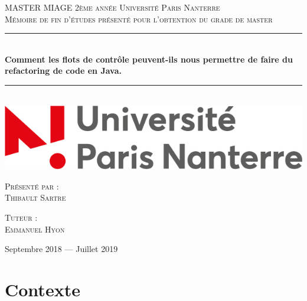 \documentclass[a4paper,twoside,12pt,openright]{report}
\newcommand{\HRule}{\rule{\linewidth}{0.5mm}}
\begin{document}
\begin{titlepage}
  \begin{sffamily}
  \begin{center}

    \textsc{\LARGE MASTER MIAGE 2ème année \linebreak Université Paris Nanterre}\\[2cm]

    \textsc{\Large Mémoire de fin d’études présenté pour l’obtention du grade de master}\\[1.5cm]

    \HRule \\[0.4cm]
    { \huge \bfseries Comment les flots de contrôle peuvent-ils nous permettre de faire du refactoring de code en Java. \\[0.4cm] }

    \HRule \\[2cm]
    \includegraphics[scale=0.40]{image/univ.jpg}
    \hspace{2cm}
    
    \vfill
  \begin{minipage}{0.4\textwidth}
      \begin{flushleft} \large
        \textsc{Présenté par :}\\ \textsc{Thibault Sartre}\\
      \end{flushleft}
    \end{minipage}
    \begin{minipage}{0.4\textwidth}
      \begin{flushright} \large
        \textsc{Tuteur :}\\ \textsc{Emmanuel Hyon}\\
      \end{flushright}
    \end{minipage}
    \vfill
    {\large Septembre 2018 — Juillet 2019}
  \end{center}
  \end{sffamily}
\end{titlepage}
\renewcommand{\contentsname}{Sommaire}
\tableofcontents{}
\chapter{Contexte}
\end{document}
